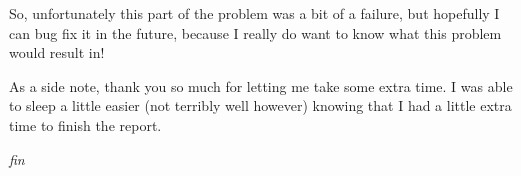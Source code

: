 \documentclass[11pt]{article}
\begin{document}
    So, unfortunately this part of the problem was a bit of a failure, but
    hopefully I can bug fix it in the future, because I really do want to know
    what this problem would result in!

    As a side note, thank you so much for letting me take some extra time. I
    was able to sleep a little easier (not terribly well however) knowing that
    I had a little extra time to finish the report.
    \medskip
    \begin{center}
        \textit{fin}
    \end{center}
\end{document}
